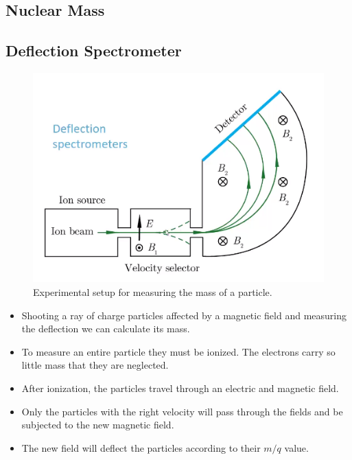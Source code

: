 \documentclass{article}
\begin{document}
\subsection{Nuclear Mass}
\subsection{Deflection Spectrometer}
\begin{figure}[ht!]
\centering
\includegraphics[width = .5\textwidth]{deflection_spectrometer.png}
\caption{Experimental setup for measuring the mass of a particle.}
\label{fig: deflection_spectrometer}
\end{figure}

\begin{itemize}
    \item Shooting a ray of charge particles affected by a magnetic field and measuring the deflection we can calculate its mass. 
    \item To measure an entire particle they must be ionized. The electrons carry so little mass that they are neglected.
    \item After ionization, the particles travel through an electric and magnetic field. 
    \item Only the particles with the right velocity will pass through the fields and be subjected to the new magnetic field. 
    \item The new field will deflect the particles according to their $m / q$ value. 
\end{itemize}
\end{document}
